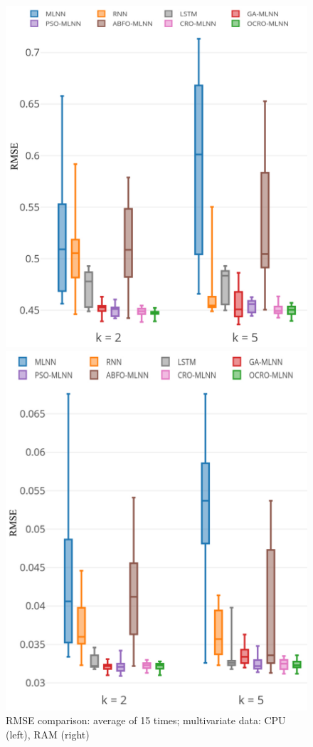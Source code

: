 \documentclass[review,3p,authoryear]{elsarticle}
\begin{document}
{\begin{figure}
	\centering
	\begin{minipage}[t]{8cm}
		\centering
		\includegraphics[width=0.91\textwidth =0cm 0cm 0cm 0cm]{images/pdf/stability/st_cpu_2.pdf}
	\end{minipage}
	\begin{minipage}[t]{8cm}
		\centering
		\includegraphics[width=0.87\textwidth =0cm 0cm 0cm 0cm]{images/pdf/stability/st_ram_2.pdf}
	\end{minipage}
	\caption{RMSE comparison: average of 15 times; multivariate data: CPU (left), RAM (right)} 
	\label{fig:stability_multi}
\end{figure}


}
\end{document}
